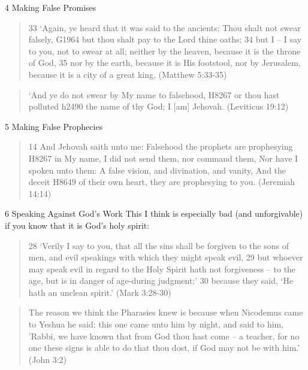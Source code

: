 \documentclass[11pt]{article}
\begin{document}
{\Large 4 Making False Promises}\newline

\begin{quote}
33 `Again, ye heard that it was said to the ancients: Thou shalt not swear falsely, G1964 but thou shalt pay to the Lord thine oaths;
34 but I -- I say to you, not to swear at all; neither by the heaven, because it is the throne of God,
35 nor by the earth, because it is His footstool, nor by Jerusalem, because it is a city of a great king,
(Matthew 5:33-35)
\end{quote}
\begin{quote}
 `And ye do not swear by My name to falsehood, H8267 or thou hast polluted  h2490 the name of thy God; I [am] Jehovah.
(Leviticus 19:12)
\end{quote}

{\Large 5 Making False Prophecies}

\begin{quote}
14 And Jehovah saith unto me: Falsehood the prophets are prophesying H8267 in My name, I did not send them, nor command them, Nor have I spoken unto them: A false vision, and divination, and vanity, And the deceit H8649 of their own heart, they are prophesying to you.
(Jeremiah 14:14)
\end{quote}

{\Large 6 Speaking Against God's Work}\newline
This I think is especially bad (and unforgivable) if you know that it is God's holy spirit:

\begin{quote}
28 `Verily I say to you, that all the sins shall be forgiven to the sons of men, and evil speakings with which they might speak evil,
29 but whoever may speak evil in regard to the Holy Spirit hath not forgiveness -- to the age, but is in danger of age-during judgment;'
30 because they said, `He hath an unclean spirit.'
(Mark 3:28-30)
\end{quote}
\begin{quote}
The reason we think the Pharasies knew is because when Nicodemus came to Yeshua he said: this one came unto him by night, and said to him, 'Rabbi, we have known that from God thou hast come -- a teacher, for no one these signs is able to do that thou dost, if God may not be with him.' (John 3:2)
\end{quote}
\end{document}
